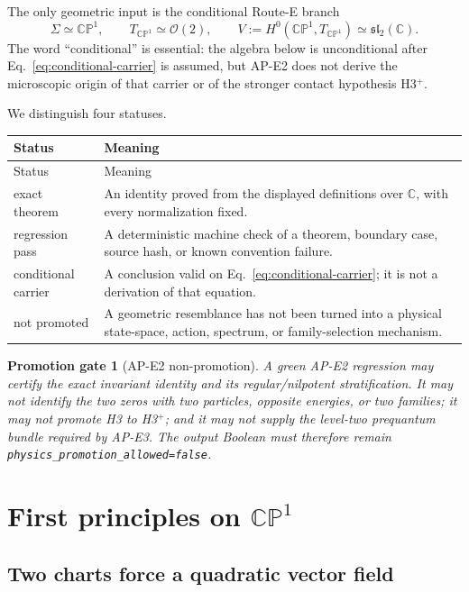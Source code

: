 \documentclass[11pt]{article}
\numberwithin{equation}{section}
\newcommand{\CP}{\mathbb{CP}}
\newcommand{\CC}{\mathbb C}
\newcommand{\cO}{\mathcal O}
\newcommand{\sltwo}{\mathfrak{sl}_2(\mathbb C)}
\newcommand{\status}[1]{\textsf{#1}}
\newcommand{\nopromote}{\texttt{physics\_promotion\_allowed=false}}
\newtheorem{gate}[theorem]{Promotion gate}
\begin{document}
The only geometric input is the conditional Route-E branch
\begin{equation}
 \Sigma\simeq\CP^1,
 \qquad T_{\CP^1}\simeq\cO(2),
 \qquad V:=H^0(\CP^1,T_{\CP^1})\simeq\sltwo.
 \label{eq:conditional-carrier}
\end{equation}
The word ``conditional'' is essential: the algebra below is unconditional
after Eq.~\eqref{eq:conditional-carrier} is assumed, but AP-E2 does not derive
the microscopic origin of that carrier or of the stronger contact hypothesis
H3$^+$.

We distinguish four statuses.
\begin{longtable}{>{\raggedright\arraybackslash}p{}
                  >{\raggedright\arraybackslash}p{}}
\toprule
Status & Meaning \\
\midrule
\endfirsthead
\toprule
Status & Meaning \\
\midrule
\endhead
\status{exact theorem} & An identity proved from the displayed definitions
over \(\CC\), with every normalization fixed.\\
\status{regression pass} & A deterministic machine check of a theorem,
boundary case, source hash, or known convention failure.\\
\status{conditional carrier} & A conclusion valid on
Eq.~\eqref{eq:conditional-carrier}; it is not a derivation of that equation.\\
\status{not promoted} & A geometric resemblance has not been turned into a
physical state-space, action, spectrum, or family-selection mechanism.\\
\bottomrule
\end{longtable}

\begin{gate}[AP-E2 non-promotion]
A green AP-E2 regression may certify the exact invariant identity and its
regular/nilpotent stratification.  It may not identify the two zeros with two
particles, opposite energies, or two families; it may not promote H3 to
H3$^+$; and it may not supply the level-two prequantum bundle required by
AP-E3.  The output Boolean must therefore remain
\nopromote.
\end{gate}

\section{First principles on \texorpdfstring{$\CP^1$}{CP1}}

\subsection{Two charts force a quadratic vector field}
\end{document}
